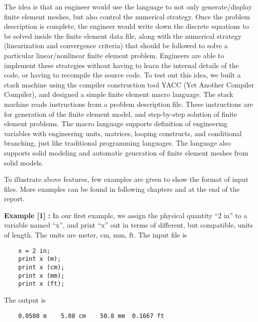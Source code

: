 \noindent\hspace{0.5 in}
The idea is that an engineer would use the language to not only generate/display
finite element meshes, but also control the numerical strategy.
Once the problem description is complete, the engineer would write down the discrete
equations to be solved inside the finite element data file, along with the numerical strategy
(linearization and convergence criteria) that should be followed to solve
a particular linear/nonlinear finite element problem.
Engineers are able to implement these strategies
without having to learn the internal details of the code, or having to recompile the
source code. To test out this idea, we built a stack machine using the
compiler construction tool YACC (Yet Another Compiler Compiler), and designed
a simple finite element macro language. The stack machine reads instructions
from a problem description file. These instructions are for generation of the finite 
element model, and step-by-step solution of finite element problems. 
The macro language supports definition of engineering variables
with engineering units, matrices, looping constructs, and conditional branching,
just like traditional programming languages. The language also supports solid
modeling and automatic generation of finite element meshes from solid models.

\vspace{0.15 in}
\noindent\hspace{0.5 in}
To illustrate above features, few examples are given to show the format of
input files. More examples can be found in following chapters and at the
end of the report.
\vspace{0.15 in}

\noindent
{\bf Example [1] :}
In our first example, we assign the physical
quantity ``2 in'' to a variable named ``x'',
and print ``x'' out in terms of different, but compatible,
units of length. The units are meter, cm, mm, ft.
The input file is

\begin{footnotesize}
\begin{verbatim}
    x = 2 in;
    print x (m);
    print x (cm);
    print x (mm);
    print x (ft);
\end{verbatim}
\end{footnotesize}

\noindent The output is
\begin{footnotesize}
\begin{verbatim}
    0.0508 m    5.08 cm    50.8 mm  0.1667 ft
\end{verbatim}
\end{footnotesize}
\vspace{0.05 in}

